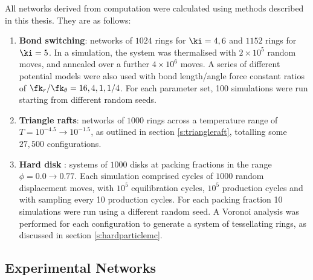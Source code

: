 All networks derived from computation were calculated using methods described in this thesis.
They are as follows:
\begin{enumerate}
	\item \textbf{Bond switching}: networks of $1024$ rings for $\ki=4,6$ and $1152$ rings for $\ki=5$. 
	In a simulation, the system was thermalised with $2\times 10^5$ random moves, and annealed over a further $4\times 10^6$ moves. 
	A series of different potential models were also used with bond length/angle force constant ratios of $\fk_r/\fk_\theta=16,4,1,1/4$. 
	For each parameter set, 100 simulations were run starting from different random seeds.
	\item \textbf{Triangle rafts}: networks of $1000$ rings across a temperature range of $T=10^{-4.5}\rightarrow10^{-1.5}$, as outlined in section \ref{s:triangleraft}, totalling some $27,500$ configurations.  
	\item \textbf{Hard disk \mc}: systems of $1000$ disks at packing fractions in the range $\phi=0.0\rightarrow0.77$.
	Each simulation comprised cycles of $1000$ random displacement moves, with $10^5$ equilibration cycles, $10^5$ production cycles and with sampling every 10 production cycles. 
	For each packing fraction 10 simulations were run using a different random seed.
	 A Voronoi analysis was performed for each configuration to generate a system of tessellating rings, as discussed in section \ref{s:hardparticlemc}.
\end{enumerate} 

\subsection{Experimental Networks}
\label{s:genexpnetworks}

